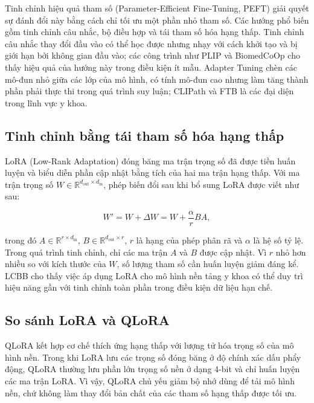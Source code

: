 Tinh chỉnh hiệu quả tham số (Parameter-Efficient Fine-Tuning, PEFT) giải quyết sự đánh đổi này bằng cách chỉ tối ưu một phần nhỏ tham số. Các hướng phổ biến gồm tinh chỉnh câu nhắc, bộ điều hợp và tái tham số hóa hạng thấp. Tinh chỉnh câu nhắc thay đổi đầu vào có thể học được nhưng nhạy với cách khởi tạo và bị giới hạn bởi không gian đầu vào; các công trình như PLIP \cite{PLIP} và BiomedCoOp \cite{BiomedCoOp} cho thấy hiệu quả của hướng này trong điều kiện ít mẫu. Adapter Tuning chèn các mô-đun nhỏ giữa các lớp của mô hình, có tính mô-đun cao nhưng làm tăng thành phần phải thực thi trong quá trình suy luận; CLIPath \cite{CLIPath} và FTB \cite{FTB} là các đại diện trong lĩnh vực y khoa.

\subsection{Tinh chỉnh bằng tái tham số hóa hạng thấp}
\label{subsec:lora}

LoRA (Low-Rank Adaptation) đóng băng ma trận trọng số đã được tiền huấn luyện và biểu diễn phần cập nhật bằng tích của hai ma trận hạng thấp. Với ma trận trọng số
$W \in \mathbb{R}^{d_{\mathrm{out}} \times d_{\mathrm{in}}}$, phép biến đổi sau khi bổ sung LoRA được viết như sau:

\begin{equation}
W' = W + \Delta W
   = W + \frac{\alpha}{r}BA,
\label{eq:lora_update}
\end{equation}

trong đó $A \in \mathbb{R}^{r \times d_{\mathrm{in}}}$,
$B \in \mathbb{R}^{d_{\mathrm{out}} \times r}$, $r$ là hạng của phép phân rã và $\alpha$ là hệ số tỷ lệ. Trong quá trình tinh chỉnh, chỉ các ma trận $A$ và $B$ được cập nhật. Vì $r$ nhỏ hơn nhiều so với kích thước của $W$, số lượng tham số cần huấn luyện giảm đáng kể. LCBB \cite{LCBB} cho thấy việc áp dụng LoRA cho mô hình nền tảng y khoa có thể duy trì hiệu năng gần với tinh chỉnh toàn phần trong điều kiện dữ liệu hạn chế.

\subsection{So sánh LoRA và QLoRA}
\label{subsec:lora_qlora}

QLoRA kết hợp cơ chế thích ứng hạng thấp với lượng tử hóa trọng số của mô hình nền. Trong khi LoRA lưu các trọng số đóng băng ở độ chính xác dấu phẩy động, QLoRA thường lưu phần lớn trọng số nền ở dạng 4-bit và chỉ huấn luyện các ma trận LoRA. Vì vậy, QLoRA chủ yếu giảm bộ nhớ dùng để tải mô hình nền, chứ không làm thay đổi bản chất của các tham số hạng thấp được tối ưu.

